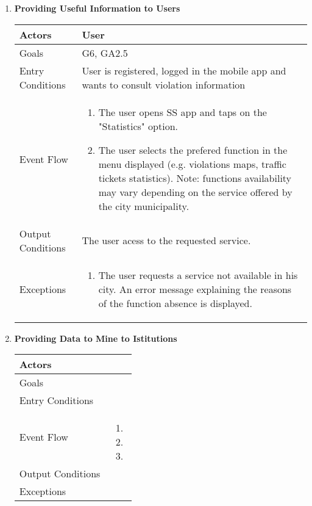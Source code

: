 \begin{enumerate}
	\item \textbf{Providing Useful Information to Users}
		\begin{table}[h!]
		\begin{tabular}{|l|p{}|}
		\hline
		Actors            			&       	User\\ \hline
		Goals             			&         G6, GA2.5\\ \hline
		Entry Conditions  	&  		User is registered, logged in the mobile app and wants to consult violation information\\ \hline
		Event Flow        		&          
				\begin{enumerate}[label=\alph*)]
					\item The user opens SS app and taps on the "Statistics" option.
					\item The user selects the prefered function in the menu displayed (e.g. violations maps, traffic tickets statistics). \newline
								Note: functions availability may vary depending on the service offered by the city municipality.
				\end{enumerate}\\ \hline
		Output Conditions &    		The user acess to the requested service.\\ \hline		
				
		Exceptions        		&       	
				\begin{enumerate}[label=\alph*)]
					\item The user requests a service not available in his city. An error message explaining the reasons of the function absence is displayed.
				\end{enumerate}\\ \hline
	\end{tabular}
	\end{table}
	
	\item \textbf{Providing Data to Mine to Istitutions}
		\begin{table}[h!]
		\begin{tabular}{|l|p{}|}
		\hline
		Actors            			&       	\\ \hline
		Goals             			&         	\\ \hline
		Entry Conditions  	&  		\\ \hline
		Event Flow        		&          
				\begin{enumerate}[label=\alph*)]
					\item
					\item
					\item
					\end{enumerate}\\ \hline
		Output Conditions &    		\\ \hline
		Exceptions        		&       	\\ \hline
	\end{tabular}
	\end{table}
	

\end{enumerate}

